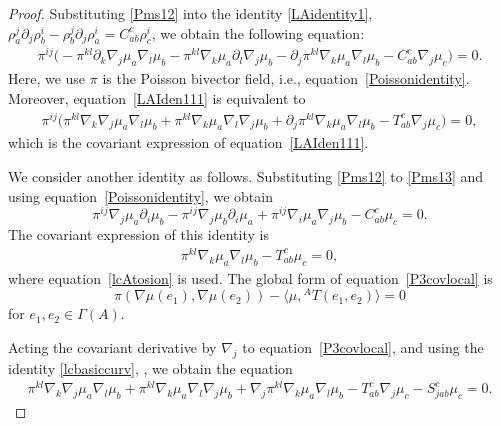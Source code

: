 \documentclass[pdftex]{sigma}
\numberwithin{equation}{section}
\begin{document}
\begin{proof}
Substituting \eqref{Pms12} into the identity \eqref{LAidentity1},
$\rho_a^j \partial_j \rho_{b}^i - \rho_b^j \partial_j \rho_{a}^i = C_{ab}^c \rho_c^i$,
we obtain the following equation:
\begin{gather}
 \pi^{ij} \bigl(-\pi^{kl} \partial_k \nabla_j \mu_a \nabla_l \mu_b
- \pi^{kl} \nabla_k \mu_a \partial_l \nabla_j \mu_b
- \partial_j \pi^{kl} \nabla_k \mu_a \nabla_l \mu_b
- C_{ab}^c \nabla_j \mu_c\bigr)=0.
\label{LAIden111}
\end{gather}
Here, we use $\pi$ is the Poisson bivector field, i.e.,
equation~\eqref{Poissonidentity}.
Moreover, equation~\eqref{LAIden111} is equivalent to
\begin{gather}
\pi^{ij} \bigl(\pi^{kl} \nabla_k \nabla_j \mu_a \nabla_l \mu_b
+ \pi^{kl} \nabla_k \mu_a \nabla_l \nabla_j \mu_b
+ \partial_j \pi^{kl} \nabla_k \mu_a \nabla_l \mu_b
- T_{ab}^c \nabla_j \mu_c\bigr)=0,
\label{identity11}
\end{gather}
which is the covariant expression of equation~\eqref{LAIden111}.

We consider another identity as follows.
Substituting \eqref{Pms12} to \eqref{Pms13}
and using equation~\eqref{Poissonidentity},
we obtain
\[%
 \pi^{ij} \nabla_j \mu_a \partial_i \mu_b
- \pi^{ij} \nabla_j \mu_b \partial_i \mu_a
+ \pi^{ij} \nabla_i \mu_a \nabla_j \mu_b
- C_{ab}^c \mu_c=0.
\]
The covariant expression of this identity is
\begin{gather}
\pi^{kl} \nabla_k \mu_a \nabla_l \mu_b
- T_{ab}^c \mu_c=0,
\label{P3covlocal}
\end{gather}
where equation~\eqref{lcAtosion} is used.
The global form of equation~\eqref{P3covlocal} is
\[
\pi(\nabla \mu(e_1), \nabla \mu(e_2))
- \big\langle\mu,{}^A T(e_1, e_2)\big\rangle = 0
\]
for $e_1, e_2 \in \Gamma(A)$.

Acting the covariant derivative by $\nabla_j$ to equation~\eqref{P3covlocal},
and using the identity \eqref{lcbasiccurv},
,
we obtain the equation
\begin{gather}
 \pi^{kl} \nabla_k \nabla_j \mu_a \nabla_l \mu_b
+ \pi^{kl} \nabla_k \mu_a \nabla_l \nabla_j \mu_b
+ \nabla_j \pi^{kl} \nabla_k \mu_a \nabla_l \mu_b
- T_{ab}^c \nabla_j \mu_c
- S_{jab}^c \mu_c =0.
\label{identity12}
\end{gather}


\end{proof}
\end{document}
